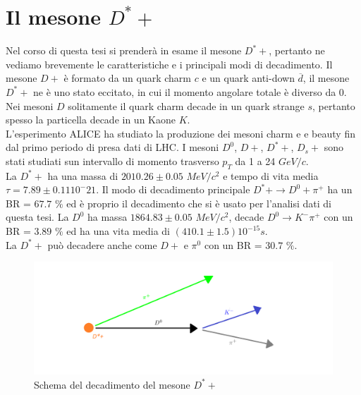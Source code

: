 \section{Il mesone $D^*+$}
Nel corso di questa tesi si prenderà in esame il mesone $D^*+$, pertanto ne vediamo brevemente le caratteristiche e i principali modi di decadimento. Il mesone $D+$ è formato da un quark charm $c$ e un quark anti-down $\overline{d}$, il mesone $D^*+$ ne è uno stato eccitato, in cui il momento angolare totale è diverso da 0. Nei mesoni $D$ solitamente il quark charm decade in un quark strange $s$, pertanto spesso la particella decade in un Kaone $K$. 
\\L'esperimento ALICE ha studiato la produzione dei mesoni charm e e beauty fin dal primo periodo di presa dati di LHC. I mesoni $D^0$, $D+$, $D^*+$, $D_s+$  sono stati studiati sun intervallo di momento trasverso $p_T$ da 1 a 24 $GeV/c$.  \cite{mesoniD}
\\La $D^*+$ ha una massa di $2010.26 \pm 0.05$ $MeV/c^2$ e tempo di vita media $ \tau = 7.89 \pm 0.11 {10^-21}$. Il modo di decadimento principale $D^*+ \rightarrow D^0 + \pi^+ $ ha un BR = $67.7$ $\% $ ed è proprio il decadimento che si è usato per l'analisi dati di questa tesi. La $D^0$ ha massa $ 1864.83 \pm 0.05 $ $MeV/c^2$, decade $D^0 \rightarrow K^- \pi^+$ con un BR = $3.89$ $\%$ ed ha una vita media di $(410.1 \pm 1.5 ) 10^{-15} s $.
\\La $D^*+$ può decadere anche come $D+$ e $\pi^0$ con un BR = $30.7$ $\%$. \cite{PDG}

    \begin{figure}[htbp]
        \centering
        \includegraphics[width=1.0\linewidth]{introParticelle/decadimentoD.png}
        \caption{ Schema del decadimento del mesone $D^*+$}
        \label{fig:decadimentoD}
    \end{figure}









